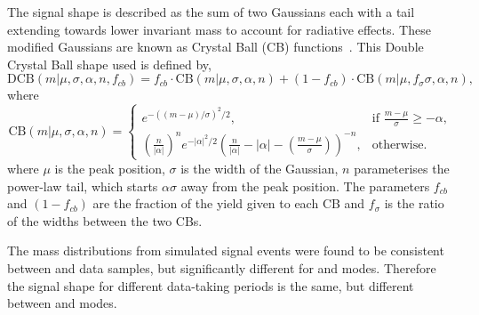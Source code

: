 The signal shape is described as the sum of two Gaussians each with a tail extending towards lower invariant mass to account for radiative effects. These modified Gaussians are known as Crystal Ball (CB) functions~\cite{Skwarnicki:1986xj}. This Double Crystal Ball shape used is defined by,
\begin{equation}
\mathrm{DCB}(m| \mu,\sigma,\alpha,n,f_{cb}) = f_{cb} \cdot \mathrm{CB}(m| \mu,\sigma,\alpha,n) + (1-f_{cb}) \cdot \mathrm{CB}(m|\mu,f_{\sigma}\sigma,\alpha,n),
\label{DCBshape}
\end{equation}
where
\begin{equation*}
  \mathrm{CB}(m| \mu,\sigma,\alpha,n)=
\begin{cases}
    e^{-((m-\mu)/ \sigma)^2/2},                                   & \text{if } \frac{m-\mu}{\sigma} \geq - \alpha, \\
   \left ( \frac{n}{|\alpha|} \right ) ^n e^{-|\alpha|^2/2} \left ( \frac{n}{|\alpha|} - |\alpha| - \left ( \frac{m-\mu}{\sigma} \right ) \right ) ^{-n} ,    & \text{otherwise.}
\end{cases}
\end{equation*}
where $\mu$ is the peak position, $\sigma$ is the width of the Gaussian, $n$ parameterises the power-law tail, which starts $\alpha\sigma$ away from the peak position. The parameters $f_{cb}$ and $(1-f_{cb})$ are the fraction of the yield given to each CB and $f_{\sigma}$ is the ratio of the widths between the two CBs.

The \Bm mass distributions from simulated signal events were found to be consistent between \runone and \runtwo data samples, but significantly different for \kpi and \kpipipi modes. Therefore the signal shape for different data-taking periods is the same, but different between \kpi and \kpipipi modes. 

